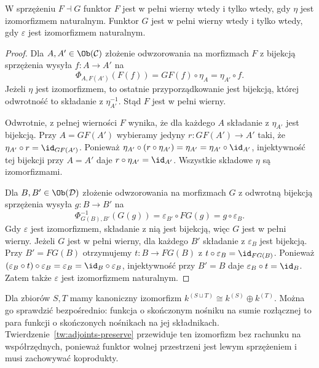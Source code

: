 \begin{stwierdzenie}\label{cat:prop:adj-full-faithful}
W sprzężeniu $F\dashv G$ funktor $F$ jest w pełni wierny wtedy i tylko wtedy, gdy $\eta$ jest izomorfizmem naturalnym. Funktor $G$ jest w pełni wierny wtedy i tylko wtedy, gdy $\varepsilon$ jest izomorfizmem naturalnym.
\end{stwierdzenie}
\begin{proof}
Dla $A,A'\in\Ob(\mathcal C)$ złożenie odwzorowania na morfizmach $F$ z bijekcją sprzężenia wysyła $f:A\to A'$ na
\[
\Phi_{A,F(A')}(F(f))=GF(f)\circ\eta_A=\eta_{A'}\circ f.
\]
Jeżeli $\eta$ jest izomorfizmem, to ostatnie przyporządkowanie jest bijekcją, której odwrotność to składanie z $\eta_{A'}^{-1}$. Stąd $F$ jest w pełni wierny.

Odwrotnie, z pełnej wierności $F$ wynika, że dla każdego $A$ składanie z $\eta_{A'}$ jest bijekcją. Przy $A=GF(A')$ wybieramy jedyny $r:GF(A')\to A'$ taki, że $\eta_{A'}\circ r=\id_{GF(A')}$. Ponieważ
$\eta_{A'}\circ(r\circ\eta_{A'})=\eta_{A'}=\eta_{A'}\circ\id_{A'}$,
injektywność tej bijekcji przy $A=A'$ daje $r\circ\eta_{A'}=\id_{A'}$. Wszystkie składowe $\eta$ są izomorfizmami.

Dla $B,B'\in\Ob(\mathcal D)$ złożenie odwzorowania na morfizmach $G$ z odwrotną bijekcją sprzężenia wysyła $g:B\to B'$ na
\[
\Phi_{G(B),B'}^{-1}(G(g))=\varepsilon_{B'}\circ FG(g)=g\circ\varepsilon_B.
\]
Gdy $\varepsilon$ jest izomorfizmem, składanie z nią jest bijekcją, więc $G$ jest w pełni wierny. Jeżeli $G$ jest w pełni wierny, dla każdego $B'$ składanie z $\varepsilon_B$ jest bijekcją. Przy $B'=FG(B)$ otrzymujemy $t:B\to FG(B)$ z $t\circ\varepsilon_B=\id_{FG(B)}$. Ponieważ $(\varepsilon_B\circ t)\circ\varepsilon_B=\varepsilon_B=\id_B\circ\varepsilon_B$, injektywność przy $B'=B$ daje $\varepsilon_B\circ t=\id_B$. Zatem także $\varepsilon$ jest izomorfizmem naturalnym.
\end{proof}

\begin{przyklad}
Dla zbiorów $S,T$ mamy kanoniczny izomorfizm $k^{(S\sqcup T)}\cong k^{(S)}\oplus k^{(T)}$. Można go sprawdzić bezpośrednio: funkcja o skończonym nośniku na sumie rozłącznej to para funkcji o skończonych nośnikach na jej składnikach. Twierdzenie~\ref{tw:adjoints-preserve} przewiduje ten izomorfizm bez rachunku na współrzędnych, ponieważ funktor wolnej przestrzeni jest lewym sprzężeniem i musi zachowywać koprodukty.
\end{przyklad}

